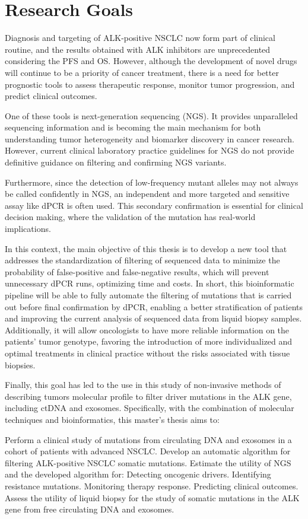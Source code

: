 \chapter{Research Goals}

Diagnosis and targeting of ALK-positive NSCLC now form part of clinical routine, and the results obtained with ALK inhibitors are unprecedented considering the PFS and OS. However, although the development of novel drugs will continue to be a priority of cancer treatment, there is a need for better prognostic tools to assess therapeutic response, monitor tumor progression, and predict clinical outcomes.

One of these tools is next-generation sequencing (NGS). It provides unparalleled sequencing information and is becoming the main mechanism for both understanding tumor heterogeneity and biomarker discovery in cancer research. However, current clinical laboratory practice guidelines for NGS do not provide definitive guidance on filtering and confirming NGS variants.

Furthermore, since the detection of low-frequency mutant alleles may not always be called confidently in NGS, an independent and more targeted and sensitive assay like dPCR is often used. This secondary confirmation is essential for clinical decision making, where the validation of the mutation has real-world implications.

In this context, the main objective of this thesis is to develop a new tool that addresses the standardization of filtering of sequenced data to minimize the probability of false-positive and false-negative results, which will prevent unnecessary dPCR runs, optimizing time and costs. In short, this bioinformatic pipeline will be able to fully automate the filtering of mutations that is carried out before final confirmation by dPCR, enabling a better stratification of patients and improving the current analysis of sequenced data from liquid biopsy samples. Additionally, it will allow oncologists to have more reliable information on the patients' tumor genotype, favoring the introduction of more individualized and optimal treatments in clinical practice without the risks associated with tissue biopsies.

Finally, this goal has led to the use in this study of non-invasive methods of describing tumors molecular profile to filter driver mutations in the ALK gene, including ctDNA and exosomes. Specifically, with the combination of molecular techniques and bioinformatics, this master's thesis aims to:
\begin{outline}
    \1 Perform a clinical study of mutations from circulating DNA and exosomes in a cohort of patients with advanced NSCLC.
    \1 Develop an automatic algorithm for filtering ALK-positive NSCLC somatic mutations.
    \1 Estimate the utility of NGS and the developed algorithm for:
        \2 Detecting oncogenic drivers.
        \2 Identifying resistance mutations.
        \2 Monitoring therapy response.
        \2 Predicting clinical outcomes.
    \1 Assess the utility of liquid biopsy for the study of somatic mutations in the ALK gene from free circulating DNA and exosomes.
\end{outline}